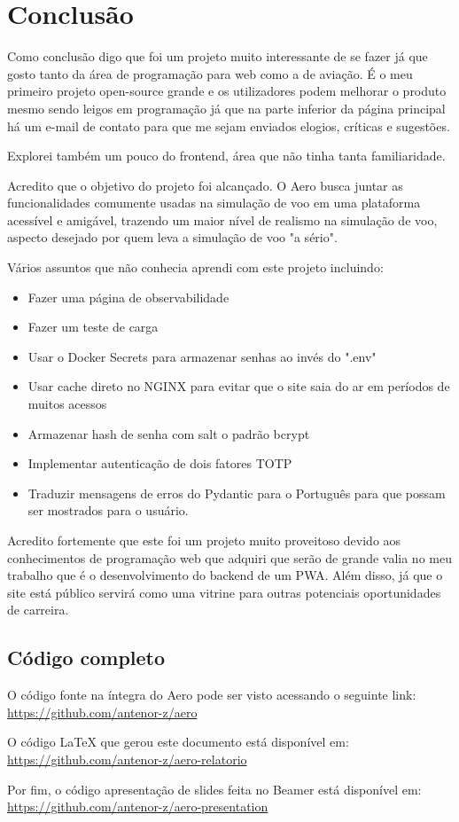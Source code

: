 \chapter{Conclusão}

Como conclusão digo que foi um projeto muito interessante de se fazer já que 
gosto tanto da área de programação para web como a de aviação. É o meu primeiro 
projeto open-source grande e os utilizadores podem melhorar o produto mesmo sendo
leigos em programação já que na parte inferior da página principal há um e-mail 
de contato para que me sejam enviados elogios, críticas e sugestões.

Explorei também um pouco do frontend, área que não tinha tanta familiaridade.

Acredito que o objetivo do projeto foi alcançado. O Aero busca juntar as funcionalidades 
comumente usadas na simulação de voo em uma plataforma acessível e amigável, 
trazendo um maior nível de realismo na simulação de voo, aspecto desejado por quem leva
a simulação de voo "a sério".

Vários assuntos que não conhecia aprendi com este projeto incluindo:

\begin{itemize}
\item Fazer uma página de observabilidade
\item Fazer um teste de carga
\item Usar o Docker Secrets para armazenar senhas ao invés do ".env"
\item Usar cache direto no NGINX para evitar que o site saia do ar em períodos 
de muitos acessos
\item Armazenar hash de senha com salt o padrão bcrypt
\item Implementar autenticação de dois fatores TOTP
\item Traduzir mensagens de erros do Pydantic para o Português para que possam 
ser mostrados para o usuário.
\end{itemize}

Acredito fortemente que este foi um projeto muito proveitoso devido aos 
conhecimentos de programação web que adquiri que serão de grande valia no meu 
trabalho que é o desenvolvimento do backend de um PWA. Além disso, já que o site está público 
servirá como uma vitrine para outras potenciais oportunidades de carreira.

\section {Código completo}

O código fonte na íntegra do Aero pode ser visto acessando o seguinte link: \url{https://github.com/antenor-z/aero}

O código LaTeX que gerou este documento está disponível em: \url{https://github.com/antenor-z/aero-relatorio}

Por fim, o código apresentação de slides feita no Beamer está disponível em: \url{https://github.com/antenor-z/aero-presentation}